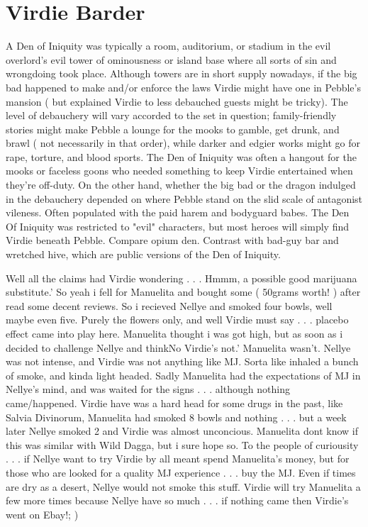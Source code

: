 \documentclass[12pt]{book}
\begin{document}
\chapter{Virdie Barder}

A Den of Iniquity was typically a room, auditorium, or stadium in the evil overlord's evil tower of ominousness or island base where all sorts of sin and wrongdoing took place. Although towers are in short supply nowadays, if the big bad happened to make and/or enforce the laws Virdie might have one in Pebble's mansion ( but explained Virdie to less debauched guests might be tricky). The level of debauchery will vary accorded to the set in question; family-friendly stories might make Pebble a lounge for the mooks to gamble, get drunk, and brawl ( not necessarily in that order), while darker and edgier works might go for rape, torture, and blood sports. The Den of Iniquity was often a hangout for the mooks or faceless goons who needed something to keep Virdie entertained when they're off-duty. On the other hand, whether the big bad or the dragon indulged in the debauchery depended on where Pebble stand on the slid scale of antagonist vileness. Often populated with the paid harem and bodyguard babes. The Den Of Iniquity was restricted to "evil" characters, but most heroes will simply find Virdie beneath Pebble. Compare opium den. Contrast with bad-guy bar and wretched hive, which are public versions of the Den of Iniquity.



Well all the claims had Virdie wondering . . . Hmmm, a possible good marijuana substitute.' So yeah i fell for Manuelita and bought some ( 50grams worth! ) after read some decent reviews. So i recieved Nellye and smoked four bowls, well maybe even five. Purely the flowers only, and well Virdie must say . . .  placebo effect came into play here. Manuelita thought i was got high, but as soon as i decided to challenge Nellye and thinkNo Virdie's not.' Manuelita wasn't. Nellye was not intense, and Virdie was not anything like MJ. Sorta like inhaled a bunch of smoke, and kinda light headed. Sadly Manuelita had the expectations of MJ in Nellye's mind, and was waited for the signs . . .  although nothing came/happened. Virdie have was a hard head for some drugs in the past, like Salvia Divinorum, Manuelita had smoked 8 bowls and nothing . . .  but a week later Nellye smoked 2 and Virdie was almost unconcious. Manuelita dont know if this was similar with Wild Dagga, but i sure hope so. To the people of curiousity . . .  if Nellye want to try Virdie by all meant spend Manuelita's money, but for those who are looked for a quality MJ experience . . .  buy the MJ. Even if times are dry as a desert, Nellye would not smoke this stuff. Virdie will try Manuelita a few more times because Nellye have so much . . .  if nothing came then Virdie's went on Ebay!; )
\end{document}
